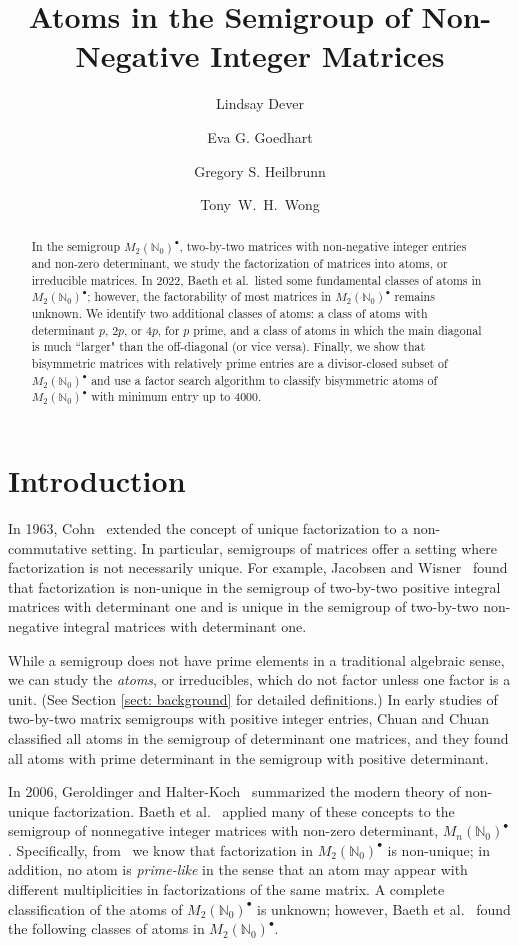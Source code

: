 \documentclass{amsart}
\title{Atoms in the Semigroup of Non-Negative Integer Matrices}
\author{Lindsay Dever}
\author{Eva G. Goedhart}
\author{Gregory S. Heilbrunn}
\author{Tony~W.~H.~Wong}
\date{}
\newcommand{\mtwo}{M_2(\mathbb{N}_0)^\bullet}
\begin{document}
\begin{abstract}
In the semigroup $\mtwo$, two-by-two matrices with non-negative integer entries and non-zero determinant, we study the factorization of matrices into atoms, or irreducible matrices. In 2022, Baeth et al.\  listed some fundamental classes of atoms in $\mtwo$; however, the factorability of most matrices in $\mtwo$ remains unknown. We identify two additional classes of atoms: a class of atoms with determinant $p$, $2p$, or $4p$, for  $p$ prime, and a class of atoms in which the main diagonal is much ``larger" than the off-diagonal (or vice versa).
Finally, we show that bisymmetric matrices with relatively prime  entries are a divisor-closed subset of $\mtwo$ and use a factor search algorithm to classify bisymmetric atoms of $\mtwo$ with minimum entry up to 4000.


\end{abstract}

\maketitle

\section{Introduction}

In 1963, Cohn~\cite{Cohn63} extended the concept of unique factorization to a non-commutative setting. In particular, semigroups of matrices offer a setting where factorization is not necessarily unique. For example, Jacobsen and Wisner~\cite{JW86} found that factorization is non-unique in the semigroup of two-by-two positive integral matrices with determinant one and is unique in the semigroup of two-by-two non-negative integral matrices with determinant one.

While a semigroup does not have prime elements in a traditional algebraic sense, we can study the {\it atoms}, or irreducibles, which do not factor  unless one factor is a unit. (See Section \ref{sect: background} for detailed definitions.) In early studies of two-by-two  matrix semigroups with positive integer entries, Chuan and Chuan~\cite{ ChuanChuan86, ChuanChuan1985} classified all atoms in the semigroup of determinant one matrices, and they found all atoms with prime determinant in the semigroup with positive determinant. 


In 2006, Geroldinger and Halter-Koch~\cite{GHK06} summarized the modern theory of non-unique factorization. Baeth et al.~\cite{Baeth11, Baeth21} applied many of these concepts to the semigroup of nonnegative integer matrices with non-zero determinant, $M_n(\mathbb{N}_0)^\bullet$.  Specifically, from~\cite{Baeth21} we know that factorization in $\mtwo$ is non-unique; in addition, no atom is {\it prime-like} in the sense that an atom may appear with different multiplicities in factorizations of the same matrix. A complete classification of the atoms of $\mtwo$ is unknown; however, Baeth et al.~\cite{Baeth21} found the following classes of atoms in $\mtwo$.
\end{document}
